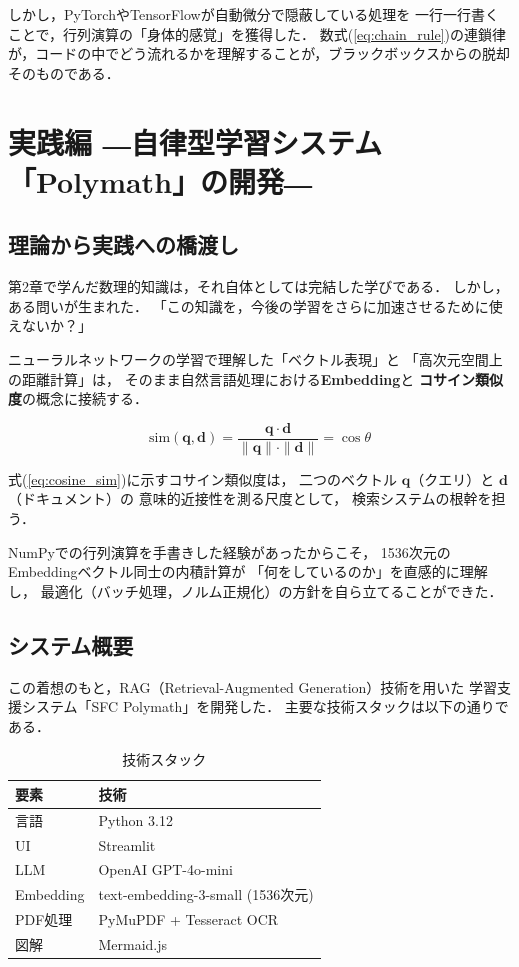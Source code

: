 \documentclass[uplatex, dvipdfmx, a4paper, 11pt]{jsarticle}
\begin{document}
しかし，PyTorchやTensorFlowが自動微分で隠蔽している処理を
一行一行書くことで，行列演算の「身体的感覚」を獲得した．
数式(\ref{eq:chain_rule})の連鎖律が，コードの中でどう流れるかを理解することが，ブラックボックスからの脱却そのものである．


\section{実践編 ―自律型学習システム「Polymath」の開発―}

\subsection{理論から実践への橋渡し}
第2章で学んだ数理的知識は，それ自体としては完結した学びである．
しかし，ある問いが生まれた．
「この知識を，今後の学習をさらに加速させるために使えないか？」

ニューラルネットワークの学習で理解した「ベクトル表現」と
「高次元空間上の距離計算」は，
そのまま自然言語処理における\textbf{Embedding}と
\textbf{コサイン類似度}の概念に接続する．

\begin{equation}
    \text{sim}(\bm{q}, \bm{d}) = \frac{\bm{q} \cdot \bm{d}}{\|\bm{q}\| \cdot \|\bm{d}\|}
    = \cos\theta
    \label{eq:cosine_sim}
\end{equation}

式(\ref{eq:cosine_sim})に示すコサイン類似度は，
二つのベクトル $\bm{q}$（クエリ）と $\bm{d}$（ドキュメント）の
意味的近接性を測る尺度として，
検索システムの根幹を担う．

NumPyでの行列演算を手書きした経験があったからこそ，
1536次元のEmbeddingベクトル同士の内積計算が
「何をしているのか」を直感的に理解し，
最適化（バッチ処理，ノルム正規化）の方針を自ら立てることができた．

\subsection{システム概要}
この着想のもと，RAG（Retrieval-Augmented Generation）技術を用いた
学習支援システム「SFC Polymath」を開発した．
主要な技術スタックは以下の通りである．

\begin{table}[H]
\centering
\begin{tabular}{ll}
\hline
\textbf{要素} & \textbf{技術} \\
\hline
言語 & Python 3.12 \\
UI & Streamlit \\
LLM & OpenAI GPT-4o-mini \\
Embedding & text-embedding-3-small (1536次元) \\
PDF処理 & PyMuPDF + Tesseract OCR \\
図解 & Mermaid.js \\
\hline
\end{tabular}
\caption{技術スタック}
\label{tab:stack}
\end{table}
\end{document}

